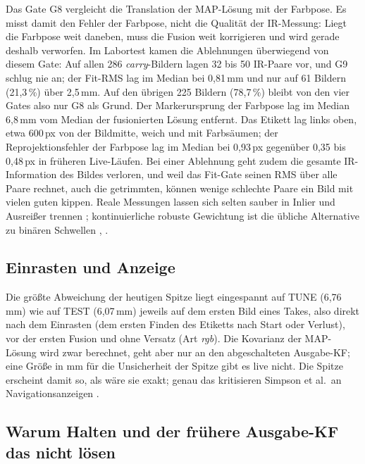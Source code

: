 \documentclass[11pt,a4paper,fleqn]{article}
\begin{document}
Das Gate G8 vergleicht die Translation der MAP-Lösung mit der Farbpose. Es misst damit den Fehler der Farbpose,
nicht die Qualität der IR-Messung: Liegt die Farbpose weit daneben, muss die Fusion weit korrigieren und wird
gerade deshalb verworfen. Im Labortest kamen die Ablehnungen überwiegend von diesem Gate: Auf allen 286
\emph{carry}-Bildern lagen 32 bis 50 IR-Paare vor, und G9 schlug nie an; der Fit-RMS lag im Median bei
0,81\,mm und nur auf 61 Bildern (21,3\,\%) über 2,5\,mm. Auf den übrigen 225 Bildern (78,7\,\%) bleibt von den
vier Gates also nur G8 als Grund. Der Markerursprung der Farbpose lag im Median 6,8\,mm vom Median der
fusionierten Lösung entfernt. Das Etikett lag links oben, etwa 600\,px von der Bildmitte, weich und mit
Farbsäumen; der Reprojektionsfehler der Farbpose lag im Median bei 0,93\,px gegenüber 0,35 bis 0,48\,px in
früheren Live-Läufen. Bei einer Ablehnung geht zudem die gesamte IR-Information des Bildes verloren, und weil das
Fit-Gate seinen RMS über alle Paare rechnet, auch die getrimmten, können wenige schlechte Paare ein Bild mit vielen
guten kippen. Reale Messungen lassen sich selten sauber in Inlier und Ausreißer trennen
\cite[S.~308]{triggs2000bundle}; kontinuierliche robuste Gewichtung ist die übliche Alternative zu binären
Schwellen \cite[Abschn.~II]{kerl2013robust}, \cite[§9.3--9.4]{zhang1997parameter}.

\subsection{Einrasten und Anzeige}

Die größte Abweichung der heutigen Spitze liegt eingespannt auf TUNE (6,76\,mm) wie auf TEST (6,07\,mm)
jeweils auf dem ersten Bild eines Takes, also direkt nach dem Einrasten (dem ersten Finden des Etiketts nach
Start oder Verlust), vor der ersten Fusion und ohne Versatz (Art \emph{rgb}). Die
Kovarianz der MAP-Lösung wird zwar berechnet, geht aber nur an den abgeschalteten Ausgabe-KF; eine Größe in mm
für die Unsicherheit der Spitze gibt es live nicht. Die Spitze erscheint damit so, als wäre sie exakt; genau das
kritisieren Simpson et al.\ an Navigationsanzeigen \cite{simpson2014computation}.

\subsection{Warum Halten und der frühere Ausgabe-KF das nicht lösen}
\end{document}
